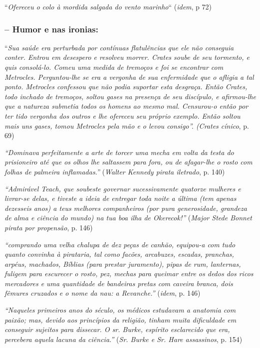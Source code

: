 \documentclass[12pt]{extarticle}
\begin{document}
``\emph{Ofereceu o colo à mordida salgada do vento marinho}``
(\emph{idem}, p 72)

\subsubsection{-- Humor e nas ironias:}

``\emph{Sua saúde era perturbada por contínuas flatulências que ele não
conseguia conter. Entrou em desespero e resolveu morrer. Crates soube de
seu tormento, e quis consolá-lo. Comeu uma medida de tremoços e foi se
encontrar com Metrocles. Perguntou-lhe se era a vergonha de sua
enfermidade que o afligia a tal ponto. Metrocles confessou que não podia
suportar esta desgraça. Então Crates, todo inchado de tremoços, soltou
gases na presença de seu discípulo, e afirmou-lhe que a natureza
submetia todos os homens ao mesmo mal. Censurou-o então por ter tido
vergonha dos outros e lhe ofereceu seu próprio exemplo. Então soltou
mais uns gases, tomou Metrocles pela mão e o levou consigo''. (Crates
cínico}, p. 69)

\emph{``Dominava perfeitamente a arte de torcer uma mecha em volta da
testa do prisioneiro até que os olhos lhe saltassem para fora, ou de
afagar-lhe o rosto com folhas de palmeira inflamadas.''} (\emph{Walter
Kennedy pirata iletrado}, p. 140)

\emph{``Admirável Teach, que soubeste governar sucessivamente quatorze
mulheres e livrar-se delas, e tiveste a ideia de entregar toda noite a
última (tem apenas dezesseis anos) a teus melhores companheiros (por
pura generosidade, grandeza de alma e ciência do mundo) na tua boa ilha
de Okerecok!''} (\emph{Major Stede Bonnet pirata por propensão}, p. 146)

\emph{``comprando uma velha chalupa de dez peças de canhão, equipou-a
com tudo quanto convinha à pirataria, tal como facões, arcabuzes,
escadas, pranchas, arpéus, machados, Bíblias (para prestar juramento),
pipas de rum, lanternas, fuligem para escurecer o rosto, pez, mechas
para queimar entre os dedos dos ricos mercadores e uma quantidade de
bandeiras pretas com caveira branca, dois fêmures cruzados e o nome da
nau: a Revanche.''} (\emph{idem}, p. 146)

\emph{``Naqueles primeiros anos do século, os médicos estudavam a
anatomia com paixão; mas, devido aos princípios da religião, tinham
muita dificuldade em conseguir sujeitos para dissecar. O sr. Burke,
espírito esclarecido que era, percebera aquela lacuna da ciência.''}
(\emph{Sr. Burke e Sr. Hare assassinos}, p. 154)
\end{document}
